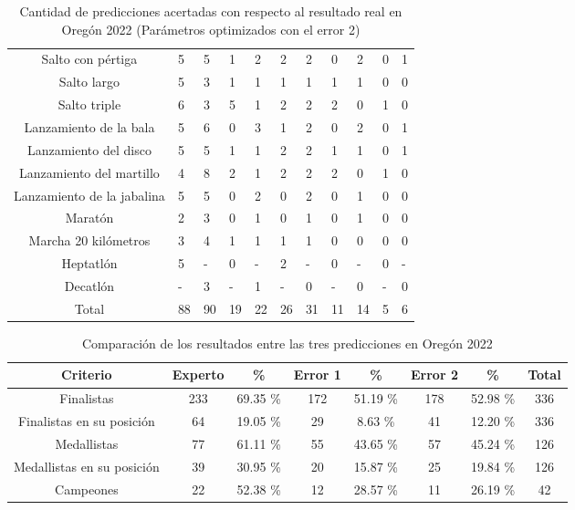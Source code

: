 \begin{table}[H]
{\begin{tabular}{|c|P{1.3cm}|P{1.2cm}|P{1.3cm}|P{1.2cm}|P{1.4cm}|P{1.2cm}|P{1.45cm}|P{1.2cm}|P{1.3cm}|P{1.2cm}|}
            Salto con pértiga & 5 & 5 & 1 & 2 & 2 & 2 & 0 & 2 & 0 & 1 \\
            Salto largo & 5 & 3 & 1 & 1 & 1 & 1 & 1 & 1 & 0 & 0 \\
            Salto triple & 6 & 3 & 5 & 1 & 2 & 2 & 2 & 0 & 1 & 0 \\
            Lanzamiento de la bala & 5 & 6 & 0 & 3 & 1 & 2 & 0 & 2 & 0 & 1 \\
            Lanzamiento del disco & 5 & 5 & 1 & 1 & 2 & 2 & 1 & 1 & 0 & 1 \\
            Lanzamiento del martillo & 4 & 8 & 2 & 1 & 2 & 2 & 2 & 0 & 1 & 0 \\
            Lanzamiento de la jabalina & 5 & 5 & 0 & 2 & 0 & 2 & 0 & 1 & 0 & 0 \\
            Maratón & 2 & 3 & 0 & 1 & 0 & 1 & 0 & 1 & 0 & 0 \\
            Marcha 20 kilómetros & 3 & 4 & 1 & 1 & 1 & 1 & 0 & 0 & 0 & 0 \\
            Heptatlón & 5 & - & 0 & - & 2 & - & 0 & - & 0 & - \\
            Decatlón & - & 3 & - & 1 & - & 0 & - & 0 & - & 0 \\
            \hline
            Total & 88 & 90 & 19 & 22 & 26 & 31 & 11 & 14 & 5 & 6 \\ \hline
        \end{tabular}
        \caption{Cantidad de predicciones acertadas con respecto al resultado real en Oregón 2022 (Parámetros optimizados con el error 2)}
        \label{tab:error2oregon}
    }
\end{table}

\begin{table}[H]
    \centering
    \resizebox{15cm}{!} {
        \begin{tabular}{|c|c|c|c|c|c|c|c|}
            \hline
            Criterio                   & Experto & \%       & Error 1 & \%       & Error 2 & \%       & Total \\\hline
            Finalistas                 & 233    & 69.35 \% & 172     & 51.19 \% & 178     & 52.98 \% & 336   \\
            Finalistas en su posición  & 64     & 19.05 \% & 29      &  8.63 \% & 41      & 12.20 \% & 336   \\
            Medallistas                & 77     & 61.11 \% & 55      & 43.65 \% & 57      & 45.24 \% & 126   \\
            Medallistas en su posición & 39     & 30.95 \% & 20      & 15.87 \% & 25      & 19.84 \% & 126   \\ 
            Campeones                  & 22     & 52.38 \% & 12      & 28.57 \% & 11      & 26.19 \% & 42    \\ \hline
        \end{tabular}
        \caption{Comparación de los resultados entre las tres predicciones en Oregón 2022}
        \label{tab:resumenoregon}
    }
\end{table}

